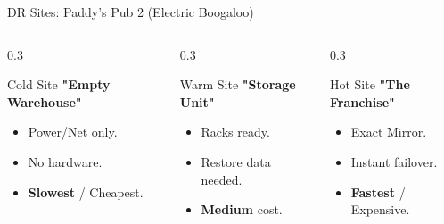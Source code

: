 \documentclass[aspectratio=169]{beamer}  %
\begin{document}
\begin{frame}{DR Sites: Paddy's Pub 2 (Electric Boogaloo)}
    \begin{columns}[T]
        \begin{column}{0.3\textwidth}
            \begin{block}{Cold Site}
                \small
                \textbf{"Empty Warehouse"}
                \begin{itemize}
                    \item Power/Net only.
                    \item No hardware.
                    \item \textbf{Slowest} / Cheapest.
                \end{itemize}
            \end{block}
        \end{column}
        \begin{column}{0.3\textwidth}
            \begin{block}{Warm Site}
                \small
                \textbf{"Storage Unit"}
                \begin{itemize}
                    \item Racks ready.
                    \item Restore data needed.
                    \item \textbf{Medium} cost.
                \end{itemize}
            \end{block}
        \end{column}
        \begin{column}{0.3\textwidth}
            \begin{block}{Hot Site}
                \small
                \textbf{"The Franchise"}
                \begin{itemize}
                    \item Exact Mirror.
                    \item Instant failover.
                    \item \textbf{Fastest} / Expensive.
                \end{itemize}
            \end{block}
        \end{column}
    \end{columns}
    \begin{center}
\end{center}
\end{frame}
\end{document}
